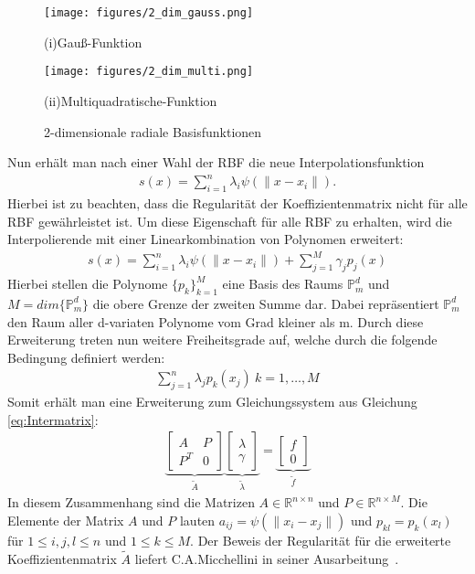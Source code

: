 \documentclass[a4paper,11pt]{article}
\begin{document}
\begin{figure}[H]
	\centering
\hspace{-1.4cm}
\begin{minipage}{0.45\textwidth}
	\texttt{[image: figures/2\_dim\_gauss.png]}
	\caption*{(i)Gauß-Funktion}
\end{minipage}
\hspace{0.5cm}
\begin{minipage}{0.45\textwidth}
	\texttt{[image: figures/2\_dim\_multi.png]}
	\caption*{(ii)Multiquadratische-Funktion}
\end{minipage}
	\caption{2-dimensionale radiale Basisfunktionen}
	\label{fig:RBF_2dim}
\end{figure}
\noindent
Nun erhält man nach einer Wahl der RBF die neue Interpolationsfunktion
\begin{align}
 s(x)=\sum_{i=1}^n\lambda_i\psi(\|x-x_i\|).
\end{align}
Hierbei ist zu beachten, dass die Regularität der Koeffizientenmatrix nicht für alle RBF gewährleistet ist. Um diese Eigenschaft für alle RBF zu erhalten, wird die Interpolierende mit einer Linearkombination von Polynomen erweitert:
\begin{align}
 s(x)=\sum_{i=1}^n\lambda_i\psi(\|x-x_i\|)+\sum_{j=1}^M\gamma_jp_j(x)
\end{align}
Hierbei stellen die Polynome $\{p_k\}_{k=1}^M$ eine Basis des Raums $\mathbb{P}_m^d$ und $M=dim\{\mathbb{P}_m^d\}$ die obere Grenze der zweiten Summe dar. Dabei repräsentiert $\mathbb{P}_m^d$ den Raum aller d-variaten Polynome vom Grad kleiner als m. Durch diese Erweiterung treten nun weitere Freiheitsgrade auf, welche durch die folgende Bedingung definiert werden:
\begin{align}
 \sum_{j=1}^n\lambda_jp_k(x_j)~k=1,\dots,M
\end{align}
Somit erhält man eine Erweiterung zum Gleichungssystem aus Gleichung \eqref{eq:Intermatrix}:
\begin{align}
\underbrace{\begin{bmatrix}
 A & P \\ P^T & 0
\end{bmatrix}}_{\tilde A}
\underbrace{\begin{bmatrix}
 \lambda  \\ \gamma
\end{bmatrix}}_{\tilde\lambda}
=
\underbrace{\begin{bmatrix}
 f  \\ 0
\end{bmatrix}}_{\tilde f}\label{eq:Inter}
\end{align}
In diesem Zusammenhang sind die Matrizen $A\in\mathbb{R}^{n\times n}$ und $P\in\mathbb{R}^{n\times M}$. Die Elemente der Matrix $A$ und $P$ lauten $a_{ij}=\psi(\|x_i-x_j\|)$ und $p_{kl}=p_k(x_l)$ für $1\le i,j,l\le n$ und $1\le k\le M$. Der Beweis der Regularität für die erweiterte Koeffizientenmatrix $\tilde A$ liefert C.A.Micchellini in seiner Ausarbeitung~\cite{micchelli1984interpolation}.
\end{document}
